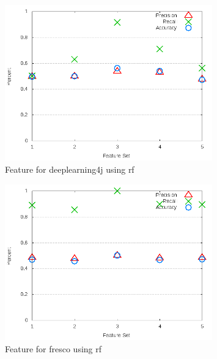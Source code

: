 \begin{figure}[!t]
\centering
\includegraphics[width=0.8\textwidth]{images/rf/test_3/deeplearning4j_sample_range.png}
\caption{Feature for deeplearning4j using \gls{rf}}
\label{fig:test_3_deeplearning4j_rf}
\end{figure}

\begin{figure}[!t]
\centering
\includegraphics[width=0.8\textwidth]{images/rf/test_3/fresco_sample_range.png}
\caption{Feature for fresco using \gls{rf}}
\label{fig:test_3_fresco_rf}
\end{figure}

